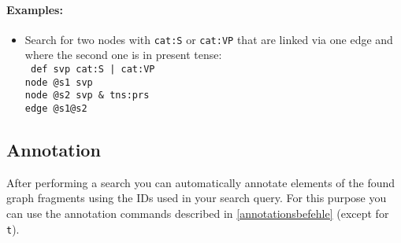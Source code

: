 \documentclass[12pt]{scrartcl}
\begin{document}
\paragraph*{Examples:}
\begin{itemize}
	\item Search for two nodes with \texttt{cat:S} or \texttt{cat:VP} that are linked via one edge and where the second one is in present tense:\\
	{\tt
	def svp cat:S | cat:VP\\[-.4ex]
	node @s1 svp\\[-.4ex]
	node @s2 svp \& tns:prs\\[-.4ex]
	edge @s1@s2\\[-.4ex]
	}
\end{itemize}



\subsection{Annotation}

After performing a search you can automatically annotate elements of the found graph fragments using the IDs used in your search query.
For this purpose you can use the annotation commands described in \ref{annotationsbefehle} (except for \texttt{t}).
\end{document}
